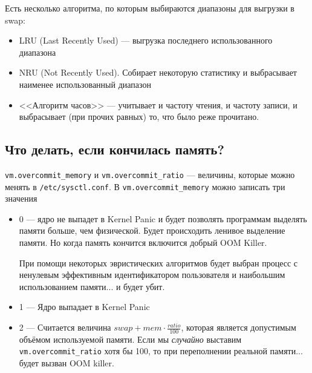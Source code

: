 Есть несколько алгоритма, по которым выбираются диапазоны для выгрузки в swap: 
\begin{itemize}
\item LRU (Last Recently Used) --- выгрузка последнего использованного диапазона
\item NRU (Not Recently Used). Собирает некоторую статистику и выбрасывает наименее использованный диапазон
\item <<Алгоритм часов>> --- учитывает и частоту чтения, и частоту записи, и выбрасывает (при прочих равных) то, что было реже прочитано.
\end{itemize}

\subsection{Что делать, если кончилась память?}

\verb!vm.overcommit_memory! и \verb!vm.overcommit_ratio! --- величины, которые можно менять в \linebreak \verb!/etc/sysctl.conf!. В \verb!vm.overcommit_memory! можно записать три значения

\begin{itemize}
\item 0 --- ядро не выпадет в Kernel Panic и будет позволять программам выделять памяти больше, чем физической. Будет происходить ленивое выделение памяти. Но когда память кончится включится добрый OOM Killer. 

При помощи некоторых эвристических алгоритмов будет выбран процесс с ненулевым эффективным идентификатором пользователя и наибольшим использованием памяти... и будет убит.

\item 1 --- Ядро выпадает в Kernel Panic

\item 2 --- Считается величина $swap + mem \cdot \frac{ratio}{100}$, которая является допустимым объёмом используемой памяти. Если мы \textit{случайно} выставим \verb!vm.overcommit_ratio! хотя бы 100, то при переполнении реальной памяти... будет вызван OOM killer.
\end{itemize}
